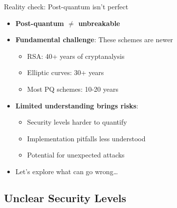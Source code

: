 \documentclass[aspectratio=169, lualatex, handout]{beamer}
\begin{document}
\begin{frame}{Reality check: Post-quantum isn't perfect}
	\begin{itemize}
		\item \textbf{Post-quantum $\neq$ unbreakable}
		\item \textbf{Fundamental challenge}: These schemes are newer
		      \begin{itemize}
			      \item RSA: 40+ years of cryptanalysis
			      \item Elliptic curves: 30+ years
			      \item Most PQ schemes: 10-20 years
		      \end{itemize}
		\item \textbf{Limited understanding brings risks}:
		      \begin{itemize}
			      \item Security levels harder to quantify
			      \item Implementation pitfalls less understood
			      \item Potential for unexpected attacks
		      \end{itemize}
		\item Let's explore what can go wrong\ldots
	\end{itemize}
\end{frame}

\subsection{Unclear Security Levels}
\end{document}
